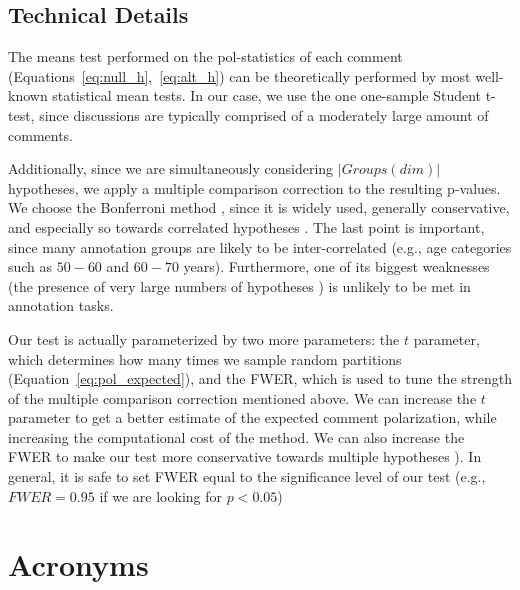 \documentclass{article}
\newcommand{\sdbdim}{\textit{dim}}
\newcommand{\Sdbgroup}{\textit{Groups}}
\begin{document}
\subsection{Technical Details}
\label{ssec:methodology:details}

The means test performed on the pol-statistics of each comment (Equations~\ref{eq:null_h},~\ref{eq:alt_h}) can be theoretically performed by most well-known statistical mean tests. In our case, we use the one one-sample Student t-test, since discussions are typically comprised of a moderately large amount of comments.

Additionally, since we are simultaneously considering $\lvert \Sdbgroup(\sdbdim) \rvert$ hypotheses, we apply a multiple comparison correction to the resulting p-values. We choose the Bonferroni method \parencite{Bland170}, since it is widely used, generally conservative, and especially so towards correlated hypotheses \parencite{ChenFengYi2017}. The last point is important, since many annotation groups are likely to be inter-correlated (e.g., age categories such as $50-60$ and $60-70$ years). Furthermore, one of its biggest weaknesses (the presence of very large numbers of hypotheses \parencite{ChenFengYi2017}) is unlikely to be met in annotation tasks.

Our test is actually parameterized by two more parameters: the $t$ parameter, which determines how many times we sample random partitions (Equation~\ref{eq:pol_expected}), and the \ac{FWER}, which is used to tune the strength of the multiple comparison correction mentioned above. We can increase the $t$ parameter to get a better estimate of the expected comment polarization, while increasing the computational cost of the method. We can also increase the \ac{FWER} to make our test more conservative towards multiple hypotheses \parencite{ChenFengYi2017}). In general, it is safe to set \ac{FWER} equal to the significance level of our test (e.g., $\textit{FWER} = 0.95$ if we are looking for $p < 0.05$)


\section{Acronyms}

\begin{acronym}[WWW]
\end{acronym}

\printbibliography
\end{document}
